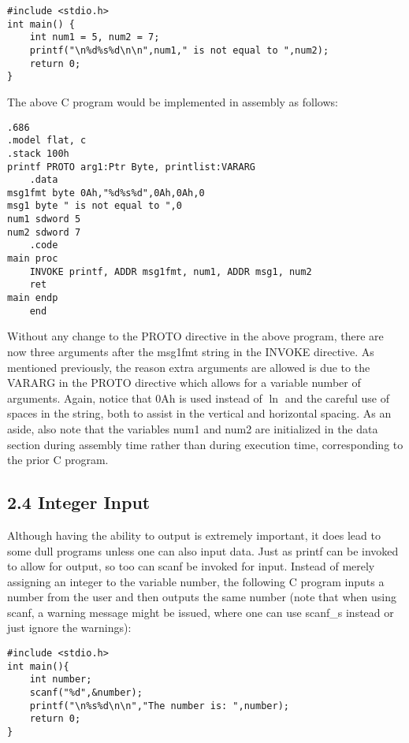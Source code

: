 \documentclass[10pt]{article}
\begin{document}
\begin{verbatim}
#include <stdio.h>
int main() {
    int num1 = 5, num2 = 7;
    printf("\n%d%s%d\n\n",num1," is not equal to ",num2);
    return 0;
}
\end{verbatim}

The above C program would be implemented in assembly as follows:

\begin{verbatim}
.686
.model flat, c
.stack 100h
printf PROTO arg1:Ptr Byte, printlist:VARARG
    .data
msg1fmt byte 0Ah,"%d%s%d",0Ah,0Ah,0
msg1 byte " is not equal to ",0
num1 sdword 5
num2 sdword 7
    .code
main proc
    INVOKE printf, ADDR msg1fmt, num1, ADDR msg1, num2
    ret
main endp
    end
\end{verbatim}

Without any change to the PROTO directive in the above program, there are now three arguments after the msg1fmt string in the INVOKE directive. As mentioned previously, the reason extra arguments are allowed is due to the VARARG in the PROTO directive which allows for a variable number of arguments. Again, notice that 0Ah is used instead of $\ln$ and the careful use of spaces in the string, both to assist in the vertical and horizontal spacing. As an aside, also note that the variables num1 and num2 are initialized in the data section during assembly time rather than during execution time, corresponding to the prior C program.

\subsection*{2.4 Integer Input}
Although having the ability to output is extremely important, it does lead to some dull programs unless one can also input data. Just as printf can be invoked to allow for output, so too can scanf be invoked for input. Instead of merely assigning an integer to the variable number, the following C program inputs a\\
number from the user and then outputs the same number (note that when using scanf, a warning message might be issued, where one can use scanf\_s instead or just ignore the warnings):

\begin{verbatim}
#include <stdio.h>
int main(){
    int number;
    scanf("%d",&number);
    printf("\n%s%d\n\n","The number is: ",number);
    return 0;
}
\end{verbatim}
\end{document}
